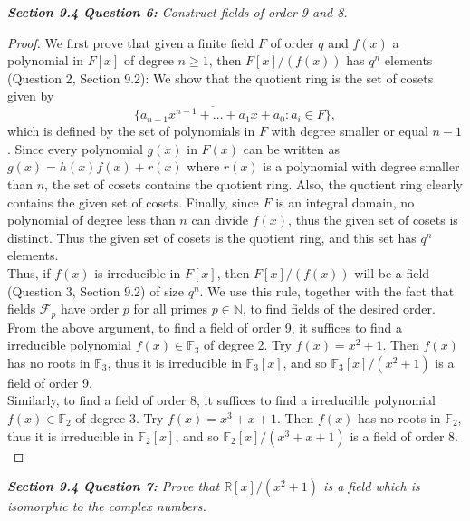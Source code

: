 \documentclass{article}
\begin{document}
\it \textbf{Section 9.4 Question 6:} Construct fields of order 9 and 8.
  \begin{proof}
    We first prove that given a finite field $F$ of order $q$ and $f(x)$ a
    polynomial in $F[x]$ of degree $n\geq1$, then $F[x]/(f(x))$ has $q^n$
    elements (Question 2, Section 9.2): We show that the quotient ring is
    the set of cosets given by
    \[\{\overline{a_{n-1}x^{n-1}+\ldots+a_1x+a_0}: a_i\in F\},\]
    which is defined by the set of polynomials in $F$ with degree smaller
    or equal $n-1$. Since every polynomial $g(x)$ in $F(x)$ can be written
    as $g(x)=h(x)f(x)+r(x)$ where $r(x)$ is a polynomial with degree
    smaller than $n$, the set of cosets contains the quotient ring. Also,
    the quotient ring clearly contains the given set of cosets. Finally,
    since $F$ is an integral domain, no polynomial of degree less than $n$
    can divide $f(x)$, thus the given set of cosets is distinct. Thus the
    given set of cosets is the quotient ring, and this set has $q^n$
    elements. \\

    Thus, if $f(x)$ is irreducible in $F[x]$, then $F[x]/(f(x))$ will be a
    field (Question 3, Section 9.2) of size $q^n$. We use this rule,
    together with the fact that fields $\mathcal{F}_p$ have order $p$ for
    all primes $p\in\mathbb{N}$, to find fields of the desired order. \\

    From the above argument, to find a field of order 9, it suffices to
    find a irreducible polynomial $f(x)\in\mathbb{F}_3$ of degree 2. Try
    $f(x)=x^2+1$. Then $f(x)$ has no roots in $\mathbb{F}_3$, thus it is
    irreducible in $\mathbb{F}_3[x]$, and so $\mathbb{F}_3[x]/(x^2+1)$ is a
    field of order 9. \\

    Similarly, to find a field of order 8, it suffices to
    find a irreducible polynomial $f(x)\in\mathbb{F}_2$ of degree 3. Try
    $f(x)=x^3+x+1$. Then $f(x)$ has no roots in $\mathbb{F}_2$, thus it is
    irreducible in $\mathbb{F}_2[x]$, and so $\mathbb{F}_2[x]/(x^3+x+1)$ is
    a field of order 8. \\
  \end{proof}

\it \textbf{Section 9.4 Question 7:} Prove that $\mathbb{R}[x]/(x^2+1)$ is
  a field which is isomorphic to the complex numbers.
\end{document}
